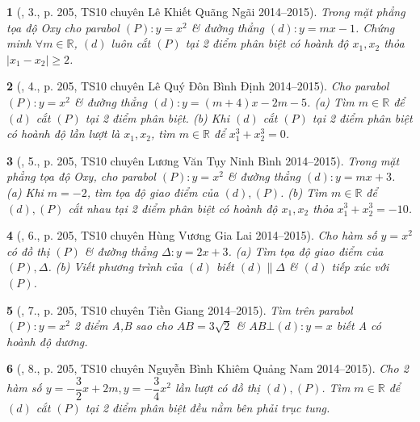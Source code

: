 \documentclass{article}
\newtheorem{baitoan}{}
\begin{document}
\begin{baitoan}[\cite{Thu_Viet_Minh_ptb2}, 3., p. 205, TS10 chuyên Lê Khiết Quãng Ngãi 2014--2015]
	Trong mặt phẳng tọa độ Oxy cho parabol $(P):y = x^2$ \& đường thẳng $(d):y = mx - 1$. Chứng minh $\forall m\in\mathbb{R}$, $(d)$ luôn cắt $(P)$ tại 2 điểm phân biệt có hoành độ $x_1,x_2$ thỏa $|x_1 - x_2|\ge2$.
\end{baitoan}

\begin{baitoan}[\cite{Thu_Viet_Minh_ptb2}, 4., p. 205, TS10 chuyên Lê Quý Đôn Bình Định 2014--2015]
	Cho parabol $(P):y = x^2$ \& đường thẳng $(d):y = (m + 4)x - 2m - 5$. (a) Tìm $m\in\mathbb{R}$ để $(d)$ cắt $(P)$ tại 2 điểm phân biệt. (b) Khi $(d)$ cắt $(P)$ tại 2 điểm phân biệt có hoành độ lần lượt là $x_1,x_2$, tìm $m\in\mathbb{R}$ để $x_1^3 + x_2^3 = 0$.
\end{baitoan}

\begin{baitoan}[\cite{Thu_Viet_Minh_ptb2}, 5., p. 205, TS10 chuyên Lương Văn Tụy Ninh Bình 2014--2015]
	Trong mặt phẳng tọa độ Oxy, cho parabol $(P):y = x^2$ \& đường thẳng $(d):y = mx + 3$. (a) Khi $m = -2$, tìm tọa độ giao điểm của $(d),(P)$. (b) Tìm $m\in\mathbb{R}$ để $(d),(P)$ cắt nhau tại 2 điểm phân biệt có hoành độ $x_1,x_2$ thỏa $x_1^3 + x_2^3 = -10$.
\end{baitoan}

\begin{baitoan}[\cite{Thu_Viet_Minh_ptb2}, 6., p. 205, TS10 chuyên Hùng Vương Gia Lai 2014--2015]
	Cho hàm số $y = x^2$ có đồ thị $(P)$ \& đường thẳng $\Delta:y = 2x + 3$. (a) Tìm tọa độ giao điểm của $(P),\Delta$. (b) Viết phương trình của $(d)$ biết $(d)\parallel\Delta$ \& $(d)$ tiếp xúc với $(P)$.
\end{baitoan}

\begin{baitoan}[\cite{Thu_Viet_Minh_ptb2}, 7., p. 205, TS10 chuyên Tiền Giang 2014--2015]
	Tìm trên parabol $(P):y = x^2$ 2 điểm A,B sao cho $AB = 3\sqrt{2}$ \& $AB\bot(d):y = x$ biết A có hoành độ dương.
\end{baitoan}

\begin{baitoan}[\cite{Thu_Viet_Minh_ptb2}, 8., p. 205, TS10 chuyên Nguyễn Bình Khiêm Quảng Nam 2014--2015]
	Cho 2 hàm số $y = -\dfrac{3}{2}x + 2m,y = -\dfrac{3}{4}x^2$ lần lượt có đồ thị $(d),(P)$. Tìm $m\in\mathbb{R}$ để $(d)$ cắt $(P)$ tại 2 điểm phân biệt đều nằm bên phải trục tung.
\end{baitoan}
\end{document}
